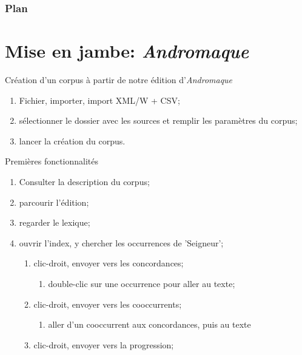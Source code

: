 \documentclass{beamer}
\begin{document}
\begin{frame} 
  \frametitle{Plan} 
  \tableofcontents
\end{frame}

\section{Mise en jambe: \textit{Andromaque}}

\begin{frame}{Création d'un corpus à partir de notre édition d'\textit{Andromaque}}

\begin{enumerate}
	\item Fichier, importer, import XML/W + CSV;
	\item sélectionner le dossier avec les sources et remplir les paramètres du corpus;
	\item lancer la création du corpus.
\end{enumerate}

\end{frame}

\begin{frame}{Premières fonctionnalités}
\begin{enumerate}
\item Consulter la description du corpus;
\item parcourir l'édition;
\item regarder le lexique;
\item ouvrir l'index, y chercher les occurrences de 'Seigneur';
	\begin{enumerate}
		\item clic-droit, envoyer vers les concordances;
			\begin{enumerate}
				\item double-clic sur une occurrence pour aller au texte;
			\end{enumerate}
		\item clic-droit, envoyer vers les cooccurrents;
			\begin{enumerate}
				\item aller d'un cooccurrent aux concordances, puis au texte
			\end{enumerate}
		\item clic-droit, envoyer vers la progression;
	\end{enumerate}
\end{enumerate}

\end{frame}
\end{document}

